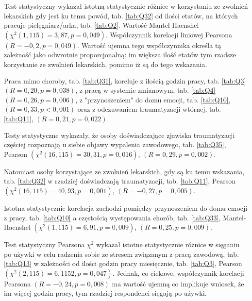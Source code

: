 \documentclass[a4paper,12pt,twoside,openright]{mwrep}
\begin{document}
Test statystyczny wykazał istotną statystycznie różnice w korzystaniu ze zwolnień lekarskich gdy jest ku temu powód, tab. \ref{tab:Q32} od ilości etatów,  na których pracuje pielęgniarz/arka, tab. \ref{tab:Q2}. Wartość Mantel-Haenshel $(\chi^2 (1, 115) = 3,87, p=0,049)$. Współczynnik korelacji liniowej Pearsona $(R = -0,2, p=0,049)$. Wartość ujemna tego współczynnika określa tą zależność jako odwrotnie proporcjonalną: im większa ilość etatów tym rzadsze korzystanie ze zwolnień lekarskich, pomimo iż są do tego wskazania.


Praca mimo choroby, tab. \ref{tab:Q31}, koreluje z ilością godzin pracy, tab. \ref{tab:Q3} $(R = 0,20, p = 0,038)$, z pracą w systemie zmianowym, tab. \ref{tab:Q4} $(R = 0,26, p = 0,006)$, z "przynoszeniem" do domu emocji, tab. \ref{tab:Q10}, $(R = 0,33, p < 0,001)$ oraz z odczuwaniem traumatyzacji wtórnej, tab. \ref{tab:Q11}, $(R = 0,21, p = 0,022)$.

Testy statystyczne wykazały, że osoby doświadczające zjawiska traumatyzacji częściej rozpoznają u siebie objawy wypalenia zawodowego, tab. \ref{tab:Q35}, 
Pearson $(\chi^2 (16, 115) = 30,31, p=0,016)$, $(R = 0,29, p = 0,002)$.


Natomiast osoby korzystające ze zwolnień lekarskich, gdy są ku temu wskazania, tab. \ref{tab:Q32} w rzadziej doświadczają traumatyzacji, tab. \ref{tab:Q11}, Pearson $(\chi^2 (16, 115) = 40,93, p=0,001)$, $(R = -0,27, p = 0,005)$.


Istotna statystycznie korelacja zachodzi pomiędzy przynoszeniem do domu emocji z pracy, tab. \ref{tab:Q10} a częstością występowania chorób, tab. \ref{tab:Q33}, Mantel-Haenshel $(\chi^2 (1, 115) = 6,91, p=0,009)$, $(R = 0,25, p = 0,009)$.

Test statystyczny Pearsona $\chi^2$ wykazał istotne statystycznie różnice w sięganiu po używki w celu radzenia sobie ze stresem związanym z pracą zawodową, tab. \ref{tab:Q13} w zależności od ilości godzin pracy miesięcznie, tab. \ref{tab:Q3}, Pearson $(\chi^2 (2, 115) = 6,1152, p=0,047)$. Jednak, co ciekawe, współczynnik korelacji Pearsona $(R = -0,24, p = 0,008)$ ma wartość ujemną co implikuje wniosek, że im więcej godzin pracy, tym rzadziej respondenci sięgają po używki.



 
\end{document}
